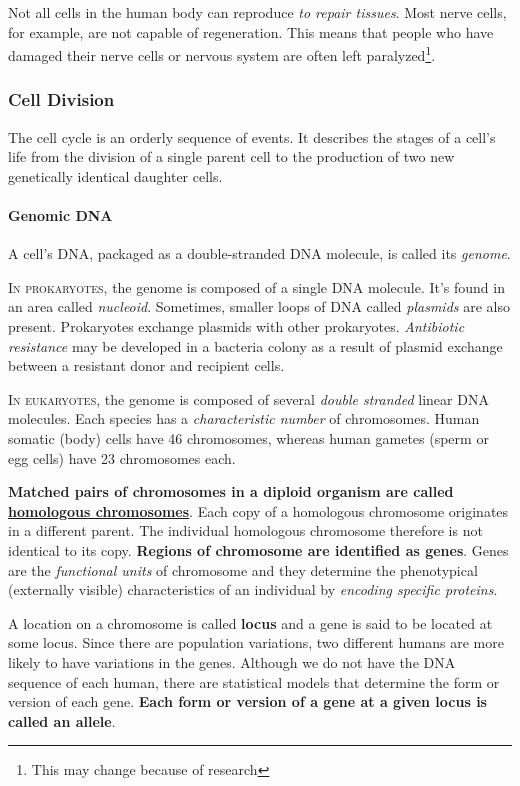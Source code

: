 Not all cells in the human body can reproduce \emph{to repair tissues}. Most nerve cells, for example, are not capable of regeneration. This means that people who have damaged their nerve cells or nervous system are often left paralyzed\footnote{This may change because of research}.
\subsubsection{Cell Division}
The cell cycle is an orderly sequence of events. It describes the stages of a cell's life from the division of a single parent cell to the production of two new genetically identical daughter cells.
\paragraph{Genomic DNA}
A cell's DNA, packaged as a double-stranded DNA molecule, is called its \emph{genome}. 

\lettrine[lines=2]{I}{n prokaryotes}, the genome is composed of a single DNA molecule. It's found in an area called \emph{nucleoid}. Sometimes, smaller loops of DNA called \emph{plasmids} are also present. Prokaryotes exchange plasmids with other prokaryotes. \emph{Antibiotic resistance} may be developed in a bacteria colony as a result of plasmid exchange between a resistant donor and recipient cells.

\lettrine[lines=2]{I}{n eukaryotes}, the genome is composed of several \emph{double stranded} linear DNA molecules. Each species has a \emph{characteristic number} of chromosomes. Human somatic (body) cells have 46 chromosomes, whereas human gametes (sperm or egg cells) have 23 chromosomes each.

\textbf{Matched pairs of chromosomes in a diploid organism are called \underline{homologous chromosomes}}. Each copy of a homologous chromosome originates in a different parent. The individual homologous chromosome therefore is not identical to its copy. \textbf{Regions of chromosome are identified as genes}. Genes are the \emph{functional units} of chromosome and they determine the phenotypical (externally visible) characteristics of an individual by \emph{encoding specific proteins}. 

A location on a chromosome is called \textbf{locus} and a gene is said to be located at some locus. Since there are population variations, two different humans are more likely to have variations in the genes. Although we do not have the DNA sequence of each human, there are statistical models that determine the form or version of each gene. \textbf{Each form or version of a gene at a given locus is called an allele}.
